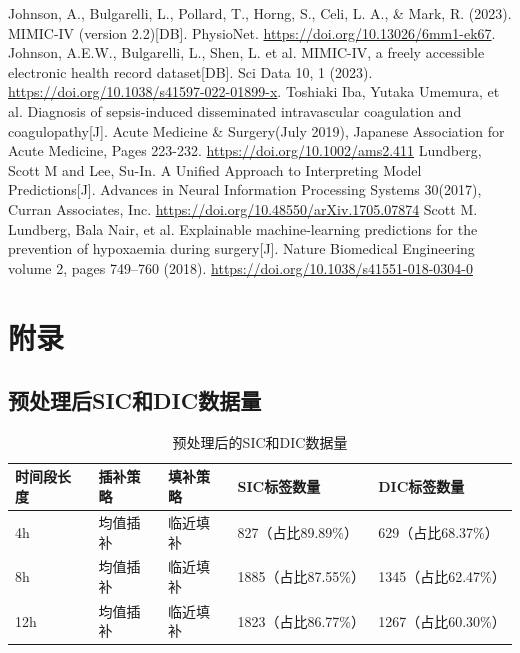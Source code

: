 \documentclass[12pt, a4paper, oneside]{ctexart}
\numberwithin{equation}{section}  %
\begin{document}
\clearpage
\begin{thebibliography}{99}
     Johnson, A., Bulgarelli, L., Pollard, T., Horng, S., Celi, L. A., \& Mark, R. (2023). 
    MIMIC-IV (version 2.2)[DB]. PhysioNet. \url{https://doi.org/10.13026/6mm1-ek67}.
     Johnson, A.E.W., Bulgarelli, L., Shen, L. et al. MIMIC-IV, 
    a freely accessible electronic health record dataset[DB]. Sci Data 10, 1 (2023). 
    \url{https://doi.org/10.1038/s41597-022-01899-x}.
     Toshiaki Iba, Yutaka Umemura, et al. 
    Diagnosis of sepsis-induced disseminated intravascular coagulation and coagulopathy[J]. 
    Acute Medicine \& Surgery(July 2019), Japanese Association for Acute Medicine, Pages 223-232.
    \url{https://doi.org/10.1002/ams2.411}
     Lundberg, Scott M and Lee, Su-In. A Unified Approach to Interpreting Model Predictions[J].
    Advances in Neural Information Processing Systems 30(2017), Curran Associates, Inc.
    \url{https://doi.org/10.48550/arXiv.1705.07874}
     Scott M. Lundberg, Bala Nair, et al. 
    Explainable machine-learning predictions for the prevention of hypoxaemia during surgery[J].
    Nature Biomedical Engineering volume 2, pages 749–760 (2018).
    \url{https://doi.org/10.1038/s41551-018-0304-0}
\end{thebibliography}
\clearpage
\appendix
\section{附录}
\subsection{预处理后SIC和DIC数据量}
\renewcommand\arraystretch{1.2} %
\begin{table}[H] %
    \centering %
    \begin{tabular}{p{}<{\centering}p{}<{\centering}p{}
        p{}p{}} %
        \toprule
        \textbf{时间段长度}&\textbf{插补策略}&\textbf{填补策略}&\textbf{SIC标签数量}&\textbf{DIC标签数量}\\
        \midrule
        4h&均值插补&临近填补&827（占比89.89\%）&629（占比68.37\%）\\
        8h&均值插补&临近填补&1885（占比87.55\%）&1345（占比62.47\%）\\
        12h&均值插补&临近填补&1823（占比86.77\%）&1267（占比60.30\%）\\
        \bottomrule
    \end{tabular}
    \caption{预处理后的SIC和DIC数据量}
    \label{table-sic-dic}
\end{table}
\end{document}
